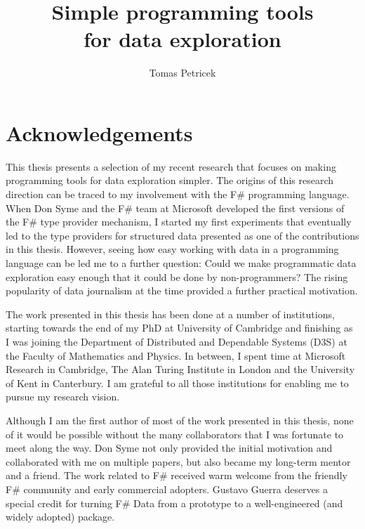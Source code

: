 \documentclass[fleqn,11pt]{report}
\theoremstyle{definition}
\begin{document}
\title{\Huge\textbf{Simple programming tools \\for data exploration}}
\author{Tomas Petricek}
\maketitle

\chapter*{Acknowledgements}
\label{ch:preface}

This thesis presents a selection of my recent research that focuses on making programming
tools for data exploration simpler. The origins of this research direction can be traced to
my involvement with the F\# programming language. When Don Syme and the F\# team at Microsoft
developed the first versions of the F\# type provider mechanism, I started my first experiments
that eventually led to the type providers for structured data presented as one of the contributions
in this thesis. However, seeing how easy working with data in a programming language can be
led me to a further question: Could we make programmatic data exploration easy enough that it
could be done by non-programmers? The rising popularity of data journalism at the time provided
a further practical motivation.

The work presented in this thesis has been done at a number of institutions, starting towards the
end of my PhD at University of Cambridge and finishing as I was joining the Department of
Distributed and Dependable Systems (D3S) at the Faculty of Mathematics and Physics. In between,
I spent time at Microsoft Research in Cambridge, The Alan Turing Institute in London and the
University of Kent in Canterbury. I am grateful to all those institutions for enabling me to
pursue my research vision.

Although I am the first author of most of the work presented in this thesis, none of it would be
possible without the many collaborators that I was fortunate to meet along the way. Don Syme
not only provided the initial motivation and collaborated with me on multiple papers, but also
became my long-term mentor and a friend. The work related to F\# received warm welcome from the
friendly F\# community and early commercial adopters. Gustavo Guerra deserves a special credit
for turning F\# Data from a prototype to a well-engineered (and widely adopted) package.
\end{document}
